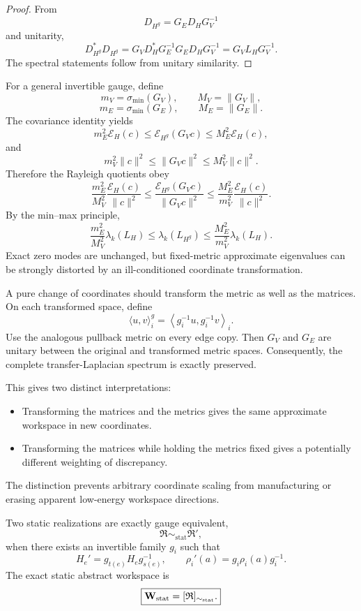 \begin{proof}
From
\[
D_{H^g}=G_ED_HG_V^{-1}
\]
and unitarity,
\[
D_{H^g}^*D_{H^g}
=
G_VD_H^*G_E^{-1}G_ED_HG_V^{-1}
=
G_VL_HG_V^{-1}.
\]
The spectral statements follow from unitary similarity.
\end{proof}


For a general invertible gauge, define
\[
m_V=\sigma_{\min}(G_V),
\qquad
M_V=\|G_V\|,
\]
\[
m_E=\sigma_{\min}(G_E),
\qquad
M_E=\|G_E\|.
\]
The covariance identity yields
\[
m_E^2\mathcal E_H(c)
\leq
\mathcal E_{H^g}(G_Vc)
\leq
M_E^2\mathcal E_H(c),
\]
and
\[
m_V^2\|c\|^2
\leq
\|G_Vc\|^2
\leq
M_V^2\|c\|^2.
\]
Therefore the Rayleigh quotients obey
\[
\boxed{
\frac{m_E^2}{M_V^2}
\frac{\mathcal E_H(c)}{\|c\|^2}
\leq
\frac{\mathcal E_{H^g}(G_Vc)}{\|G_Vc\|^2}
\leq
\frac{M_E^2}{m_V^2}
\frac{\mathcal E_H(c)}{\|c\|^2}.
}
\]
By the min--max principle,
\[
\boxed{
\frac{m_E^2}{M_V^2}\lambda_k(L_H)
\leq
\lambda_k(L_{H^g})
\leq
\frac{M_E^2}{m_V^2}\lambda_k(L_H).
}
\]
Exact zero modes are unchanged, but fixed-metric approximate eigenvalues can be
strongly distorted by an ill-conditioned coordinate transformation.


A pure change of coordinates should transform the metric as well as the
matrices. On each transformed space, define
\[
\langle u,v\rangle_i^g
=
\left\langle g_i^{-1}u,g_i^{-1}v\right\rangle_i.
\]
Use the analogous pullback metric on every edge copy. Then \(G_V\) and
\(G_E\) are unitary between the original and transformed metric spaces.
Consequently, the complete transfer-Laplacian spectrum is exactly preserved.

This gives two distinct interpretations:
\begin{itemize}
\item Transforming the matrices and the metrics gives the same approximate
workspace in new coordinates.
\item Transforming the matrices while holding the metrics fixed gives a
potentially different weighting of discrepancy.
\end{itemize}
The distinction prevents arbitrary coordinate scaling from manufacturing or
erasing apparent low-energy workspace directions.


\begin{definition}\label{def:static-equivalence}
Two static realizations are exactly gauge equivalent,
\[
\mathfrak R\sim_{\mathrm{stat}}\mathfrak R',
\]
when there exists an invertible family \(g_i\) such that
\[
H_e'=g_{t(e)}H_eg_{s(e)}^{-1},
\qquad
\rho_i'(a)=g_i\rho_i(a)g_i^{-1}.
\]
The exact static abstract workspace is
\[
\boxed{
\mathbf W_{\mathrm{stat}}
=
[\mathfrak R]_{\sim_{\mathrm{stat}}}.
}
\]
\end{definition}

